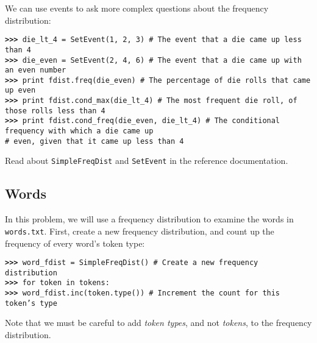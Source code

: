 \documentclass[11pt]{article}
\begin{document}
\noindent
We can use events to ask more complex questions about the frequency
distribution: 

{\small
\noindent\begin{tabbing}
\tt\textbf{>>>} die\_lt\_4 = SetEvent(1, 2, 3)
    \qquad\qquad\qquad
    \=\textrm{\# The event that a die came up less than 4} \\
\tt\textbf{>>>} die\_even = SetEvent(2, 4, 6)
    \>\textrm{\# The event that a die came up with an even number} \\
\tt\textbf{>>>} print fdist.freq(die\_even)
    \>\textrm{\# The percentage of die rolls that came up even} \\
\tt\textbf{>>>} print fdist.cond\_max(die\_lt\_4)
    \>\textrm{\# The most frequent die roll, of those rolls less than 4} \\
\tt\textbf{>>>} print fdist.cond\_freq(die\_even, die\_lt\_4)
    \>\textrm{\# The conditional frequency with which a die came up}\\
    \>\textrm{\# \qquad even, given that it came up less than 4}
\end{tabbing}}

\noindent
Read about \texttt{SimpleFreqDist} and \texttt{SetEvent} in the
reference documentation.

\subsection{Words}

In this problem, we will use a frequency distribution to examine the
words in \texttt{words.txt}.  First, create a new frequency
distribution, and count up the frequency of every word's token type:

\noindent\begin{tabbing}
\tt\textbf{>>>} word\_fdist = SimpleFreqDist()
    \qquad\qquad\qquad
    \= \textrm{\# Create a new frequency distribution} \\
\tt\textbf{>>>} for token in tokens:\\
\tt\textbf{>>>} \qquad word\_fdist.inc(token.type())
    \>\textrm{\# Increment the count for this token's type}
\end{tabbing}

\noindent
Note that we must be careful to add \emph{token types}, and not
\emph{tokens}, to the frequency distribution.
\end{document}
